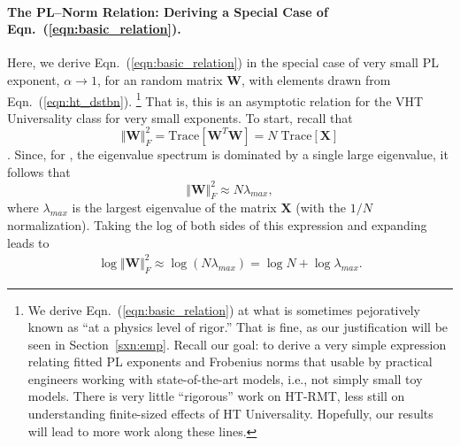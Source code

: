 

\paragraph{The PL--Norm Relation: Deriving a Special Case of Eqn.~(\ref{eqn:basic_relation}).}

Here, we derive Eqn.~(\ref{eqn:basic_relation}) in the special case of very small PL exponent, $\alpha \rightarrow 1$,
for an  random matrix $\mathbf{W}$,  with elements drawn from Eqn.~(\ref{eqn:ht_dstbn}).%
\footnote{We derive Eqn.~(\ref{eqn:basic_relation}) at what is sometimes pejoratively known as ``at a physics level of rigor.''  That is fine, as our justification will be seen in Section~\ref{sxn:emp}.  Recall our goal: to derive a very simple expression relating fitted PL exponents and Frobenius norms that usable by practical engineers working with state-of-the-art models, i.e., not simply small toy models.  There is very little ``rigorous'' work on HT-RMT, less still on understanding finite-sized effects of HT Universality.  Hopefully, our results will lead to more work along these lines.  }
That is, this is an asymptotic relation for the VHT Universality class for very small exponents.
%
To start, recall that 
$$ 
\Vert \mathbf{W}\Vert_{F}^{2}=\mbox{Trace}[\mathbf{W}^{T}\mathbf{W}]=N\;\mbox{Trace}[\mathbf{X}]
$$.
Since, for ,  the eigenvalue spectrum is dominated by a single large eigenvalue, it follows that
$$
\Vert \mathbf{W}\Vert_{F}^{2}\approx N\lambda_{max}  , 
$$
where $\lambda_{max}$ is the largest eigenvalue of the matrix $\mathbf{X}$ (with the $1/N$ normalization).
Taking the log of both sides of this expression and expanding leads to
\begin{eqnarray*}
\log\Vert \mathbf{W}\Vert_{F}^{2} 
   \approx \log \left( N\lambda_{max} \right) 
   =       \log N+\log\lambda_{max}  .
\end{eqnarray*}
